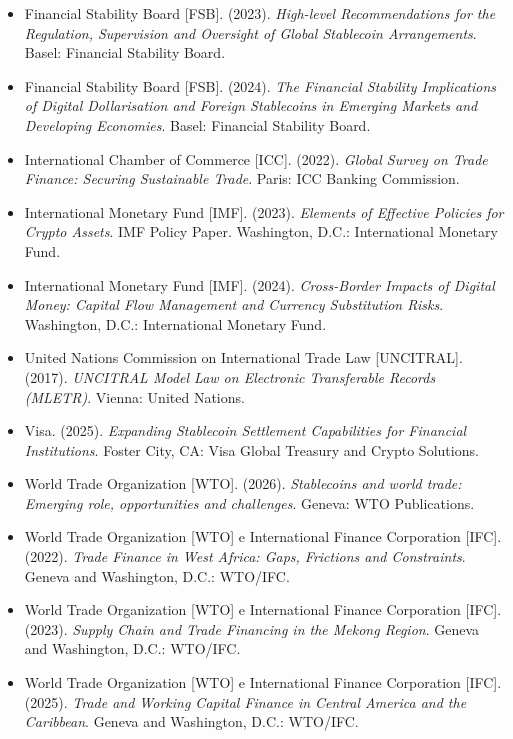 \documentclass[spanish,11pt]{article}
\begin{document}
\begin{itemize}
  \item Financial Stability Board [FSB]. (2023). \emph{High-level Recommendations for the Regulation, Supervision and Oversight of Global Stablecoin Arrangements}. Basel: Financial Stability Board.

  \item Financial Stability Board [FSB]. (2024). \emph{The Financial Stability Implications of Digital Dollarisation and Foreign Stablecoins in Emerging Markets and Developing Economies}. Basel: Financial Stability Board.

  \item International Chamber of Commerce [ICC]. (2022). \emph{Global Survey on Trade Finance: Securing Sustainable Trade}. Paris: ICC Banking Commission.

  \item International Monetary Fund [IMF]. (2023). \emph{Elements of Effective Policies for Crypto Assets}. IMF Policy Paper. Washington, D.C.: International Monetary Fund.

  \item International Monetary Fund [IMF]. (2024). \emph{Cross-Border Impacts of Digital Money: Capital Flow Management and Currency Substitution Risks}. Washington, D.C.: International Monetary Fund.

  \item United Nations Commission on International Trade Law [UNCITRAL]. (2017). \emph{UNCITRAL Model Law on Electronic Transferable Records (MLETR)}. Vienna: United Nations.

  \item Visa. (2025). \emph{Expanding Stablecoin Settlement Capabilities for Financial Institutions}. Foster City, CA: Visa Global Treasury and Crypto Solutions.

  \item World Trade Organization [WTO]. (2026). \emph{Stablecoins and world trade: Emerging role, opportunities and challenges}. Geneva: WTO Publications.

  \item World Trade Organization [WTO] e International Finance Corporation [IFC]. (2022). \emph{Trade Finance in West Africa: Gaps, Frictions and Constraints}. Geneva and Washington, D.C.: WTO/IFC.

  \item World Trade Organization [WTO] e International Finance Corporation [IFC]. (2023). \emph{Supply Chain and Trade Financing in the Mekong Region}. Geneva and Washington, D.C.: WTO/IFC.

  \item World Trade Organization [WTO] e International Finance Corporation [IFC]. (2025). \emph{Trade and Working Capital Finance in Central America and the Caribbean}. Geneva and Washington, D.C.: WTO/IFC.
\end{itemize}
\end{document}
